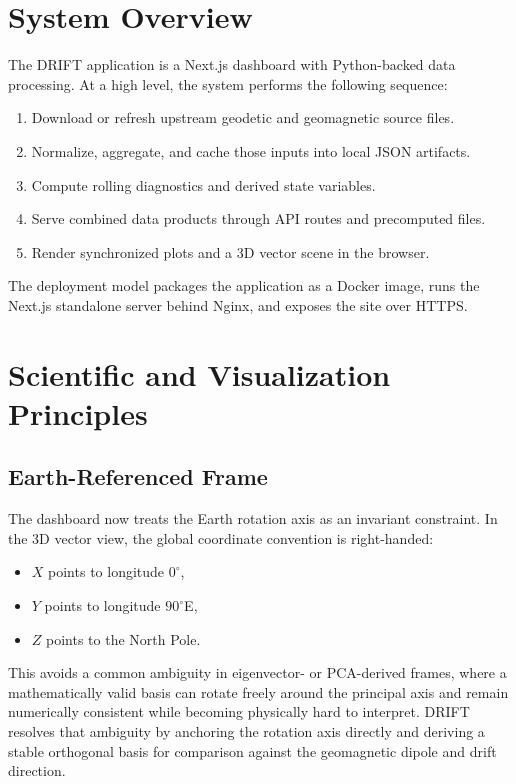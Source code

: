 \documentclass[11pt]{article}
\begin{document}
\section{System Overview}
The DRIFT application is a Next.js dashboard with Python-backed data processing. At a high level, the system performs the following sequence:
\begin{enumerate}[leftmargin=1.5em]
  \item Download or refresh upstream geodetic and geomagnetic source files.
  \item Normalize, aggregate, and cache those inputs into local JSON artifacts.
  \item Compute rolling diagnostics and derived state variables.
  \item Serve combined data products through API routes and precomputed files.
  \item Render synchronized plots and a 3D vector scene in the browser.
\end{enumerate}

The deployment model packages the application as a Docker image, runs the Next.js standalone server behind Nginx, and exposes the site over HTTPS.

\section{Scientific and Visualization Principles}
\subsection{Earth-Referenced Frame}
The dashboard now treats the Earth rotation axis as an invariant constraint. In the 3D vector view, the global coordinate convention is right-handed:
\begin{itemize}[leftmargin=1.5em]
  \item $X$ points to longitude $0^\circ$,
  \item $Y$ points to longitude $90^\circ$E,
  \item $Z$ points to the North Pole.
\end{itemize}

This avoids a common ambiguity in eigenvector- or PCA-derived frames, where a mathematically valid basis can rotate freely around the principal axis and remain numerically consistent while becoming physically hard to interpret. DRIFT resolves that ambiguity by anchoring the rotation axis directly and deriving a stable orthogonal basis for comparison against the geomagnetic dipole and drift direction.
\end{document}
